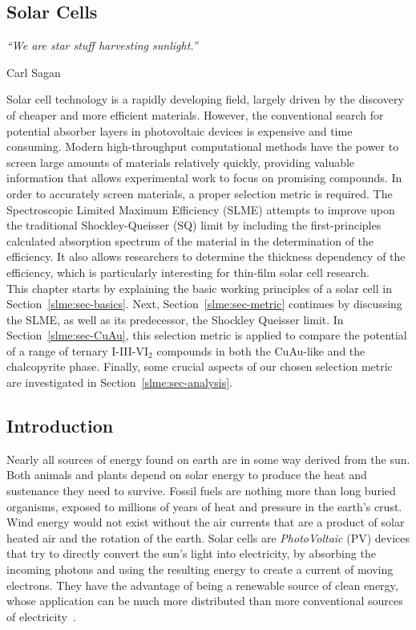 \begin{refsection} 
 
\chapter{Solar Cells}\label{chapter:solar} 
 
\setlength{\epigraphwidth}{3in} 
\epigraph{\textit{``We are star stuff harvesting sunlight.” }}{Carl Sagan} 
\vspace{3em} 
 
Solar cell technology is a rapidly developing field, largely driven by the 
discovery of cheaper and more efficient materials. However, the conventional 
search for potential absorber layers in photovoltaic devices is expensive and 
time consuming. Modern high-throughput computational methods have the power to 
screen large amounts of materials relatively quickly, providing valuable 
information that allows experimental work to focus on promising compounds. In 
order to accurately screen materials, a proper selection metric is required. 
The Spectroscopic Limited Maximum Efficiency (SLME) attempts to improve upon 
the traditional Shockley-Queisser (SQ) limit by including the first-principles 
calculated absorption spectrum of the material in the determination of the 
efficiency. It also allows researchers to determine the thickness dependency 
of the efficiency, which is particularly interesting for thin-film solar cell 
research. \\ 
 
This chapter starts by explaining the basic working principles of a solar cell 
in Section~\ref{slme:sec-basics}. Next, Section~\ref{slme:sec-metric} 
continues by discussing the SLME, as well as its predecessor, the Shockley 
Queisser limit. In Section~\ref{slme:sec-CuAu}, this selection metric is 
applied to compare the potential of a range of ternary I-III-VI$_2$ compounds 
in both the CuAu-like and the chalcopyrite phase. Finally, some crucial 
aspects of our chosen selection metric are investigated in 
Section~\ref{slme:sec-analysis}. 
 
\pagebreak 
 
\section{Introduction} 
 
Nearly all sources of energy found on earth are in some way derived from the 
sun. Both animals and plants depend on solar energy to produce the heat and 
sustenance they need to survive. Fossil fuels are nothing more than long 
buried organisms, exposed to millions of years of heat and pressure in the 
earth's crust. Wind energy would not exist without the air currents that are a 
product of solar heated air and the rotation of the earth. Solar cells are 
\textit{PhotoVoltaic} (PV) devices that try to directly convert the sun's 
light into electricity, by absorbing the incoming photons and using the 
resulting energy to create a current of moving electrons. They have the 
advantage of being a renewable source of clean energy, whose application can 
be much more distributed than more conventional sources of 
electricity~\cite{Marsden2011}. 
 

\end{refsection}

